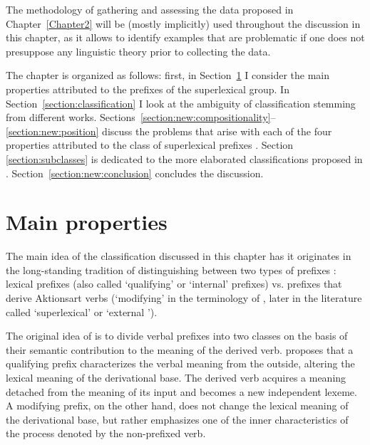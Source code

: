  The methodology of gathering and assessing the data proposed in Chapter~\ref{Chapter2} will be (mostly implicitly) used throughout the discussion in this chapter, as it allows to identify examples that are problematic if one does not presuppose any linguistic theory prior to collecting the data.

The chapter is organized as follows: first, in Section~\ref{section:properties} I consider the main properties attributed to the prefixes of the superlexical group. In Section~\ref{section:classification} I look at the ambiguity of classification stemming from different works. Sections~\ref{section:new:compositionality}--\ref{section:new:position} discuss the problems that arise with each of the four properties attributed to the class of superlexical prefixes . Section \ref{section:subclasses} is dedicated to the more elaborated classifications proposed in \citet{Tatevosov:07,Tatevosov:09}. Section~\ref{section:new:conclusion} concludes the discussion.
\section{Main properties}\label{section:properties}
The main idea of the classification discussed in this chapter has it originates in the long-standing tradition of distinguishing between two types of prefixes \citep{Isachenko:60, Forsyth:70, Townsend:75}: lexical prefixes  (also called `qualifying' or `internal' prefixes) vs. prefixes that derive Aktionsart verbs (`modifying' in the terminology of \citeauthor{Isachenko:60}, later in the literature called `superlexical' or `external ').

The original idea of \citet[222--224]{Isachenko:60} is to divide verbal prefixes into two classes on the basis of their semantic contribution to the meaning of the derived verb. \citeauthor{Isachenko:60} proposes that a qualifying prefix characterizes the verbal meaning from the outside, altering the lexical meaning of the derivational base. The derived verb acquires a meaning detached from the meaning of its input and becomes a new independent lexeme. A modifying prefix, on the other hand, does not change the lexical meaning of the derivational base, but rather emphasizes one of the inner characteristics of the process denoted by the non-prefixed verb.

